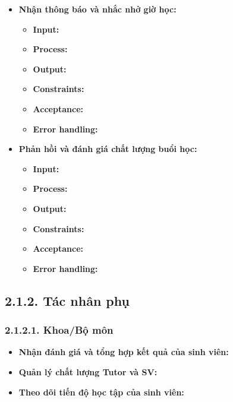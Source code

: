 \begin{itemize}
    \item \textbf{Nhận thông báo và nhắc nhở giờ học:}
    \begin{itemize}
        \item \textbf{Input:}
        \item \textbf{Process:}
        \item \textbf{Output:}
        \item \textbf{Constraints:}
        \item \textbf{Acceptance:}
        \item \textbf{Error handling:}
    \end{itemize}

    \item \textbf{Phản hồi và đánh giá chất lượng buổi học:}
    \begin{itemize}
        \item \textbf{Input:}
        \item \textbf{Process:}
        \item \textbf{Output:}
        \item \textbf{Constraints:}
        \item \textbf{Acceptance:}
        \item \textbf{Error handling:}
    \end{itemize}
\end{itemize}


\subsection*{2.1.2. Tác nhân phụ}


\subsubsection*{2.1.2.1. Khoa/Bộ môn}
\begin{itemize}
    \item \textbf{Nhận đánh giá và tổng hợp kết quả của sinh viên:}
    \item \textbf{Quản lý chất lượng Tutor và SV:}
    \item \textbf{Theo dõi tiến độ học tập của sinh viên:}
\end{itemize}

